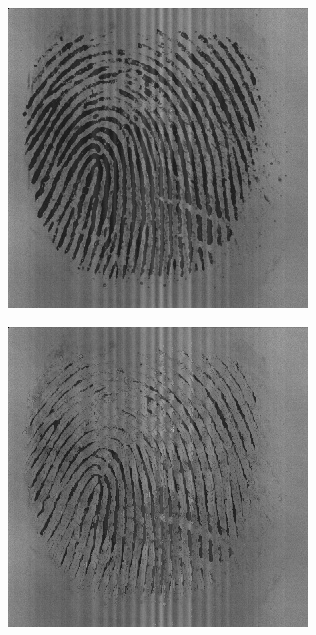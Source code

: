\documentclass{beamer}
\begin{document}
{\begin{figure}[!ht]
\begin{subfigure}[ht]{0.15\textwidth}
        \end{subfigure}
    \end{figure}
    \begin{figure}[!ht]
        \centering
        \begin{subfigure}[ht]{0.15\textwidth}
            \includegraphics[width=\textwidth]{fingerprints/2002Db3a/1_3_src.jpg}
        \end{subfigure}
        \qquad
        \begin{subfigure}[ht]{0.15\textwidth}
            \includegraphics[width=\textwidth]{fingerprints/2002Db3a/1_3_background.jpg}

\end{subfigure}
\end{figure}}
\end{document}
